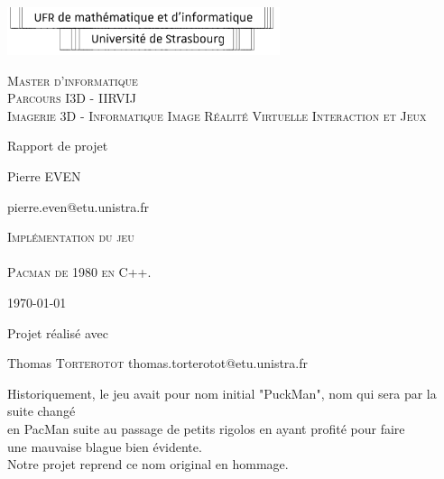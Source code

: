 \documentclass [twoside,a4paper,11pt,french] {report}
\begin{document}

\begin{center}
    \includegraphics [width=8cm] {logo-ufr.pdf}       

    \vfill

    {
	\large
	\textsc{
	    Master d'informatique \\
	    Parcours I3D - IIRVIJ \\
		Imagerie 3D - Informatique Image Réalité Virtuelle Interaction et Jeux
	}
    }

    \bigskip\bigskip
    \bigskip\bigskip

    {\huge Rapport de projet}

    \bigskip\bigskip

    {\large Pierre \textsc{EVEN}}

    {\small pierre.even@etu.unistra.fr}

    
    \vfill

    {
	\huge
	\textsc{
		Implémentation du jeu \\
	    ~ \\
        Pacman de 1980 en C++.
	}
    }

    \vfill
    \vfill

    \today

    \vfill

    {\large Projet réalisé avec}

    \medskip

    {
		\large Thomas \textsc{Torterotot} \small{thomas.torterotot@etu.unistra.fr}
	}

    \bigskip

    \bigskip
\end{center}


{
    \parskip=0pt
    \tableofcontents
}
\begin{center}
    Historiquement, le jeu avait pour nom initial "PuckMan", nom qui sera par la suite changé \\
    en PacMan suite au passage de petits rigolos en ayant profité pour faire\\
    une mauvaise blague bien évidente.
    ~ \\
    Notre projet reprend ce nom original en hommage.
\end{center}
\end{document}
